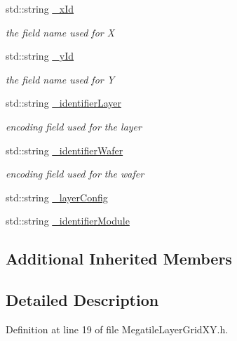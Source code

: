 \begin{DoxyCompactItemize}
\item 
std\+::string \hyperlink{class_d_d4hep_1_1_d_d_segmentation_1_1_megatile_layer_grid_x_y_a84cfbe6eadc2e1dfd01b276ec5a06cb3}{\+\_\+x\+Id}
\begin{DoxyCompactList}\small\item\em the field name used for X \end{DoxyCompactList}\item 
std\+::string \hyperlink{class_d_d4hep_1_1_d_d_segmentation_1_1_megatile_layer_grid_x_y_af0dce96a744ec959a58a8d34e3e35469}{\+\_\+y\+Id}
\begin{DoxyCompactList}\small\item\em the field name used for Y \end{DoxyCompactList}\item 
std\+::string \hyperlink{class_d_d4hep_1_1_d_d_segmentation_1_1_megatile_layer_grid_x_y_a9bd28cb051873b31327867a7636774e4}{\+\_\+identifier\+Layer}
\begin{DoxyCompactList}\small\item\em encoding field used for the layer \end{DoxyCompactList}\item 
std\+::string \hyperlink{class_d_d4hep_1_1_d_d_segmentation_1_1_megatile_layer_grid_x_y_a97bf5f24b4c9a44f74ae5c245c13c824}{\+\_\+identifier\+Wafer}
\begin{DoxyCompactList}\small\item\em encoding field used for the wafer \end{DoxyCompactList}\item 
std\+::string \hyperlink{class_d_d4hep_1_1_d_d_segmentation_1_1_megatile_layer_grid_x_y_a71605d3d5b86f140cfb6c2d7458e3cd8}{\+\_\+layer\+Config}
\item 
std\+::string \hyperlink{class_d_d4hep_1_1_d_d_segmentation_1_1_megatile_layer_grid_x_y_ac694e7f1d8e601f1893f84fb8bb6286f}{\+\_\+identifier\+Module}
\end{DoxyCompactItemize}
\subsection*{Additional Inherited Members}


\subsection{Detailed Description}


Definition at line 19 of file Megatile\+Layer\+Grid\+X\+Y.\+h.



